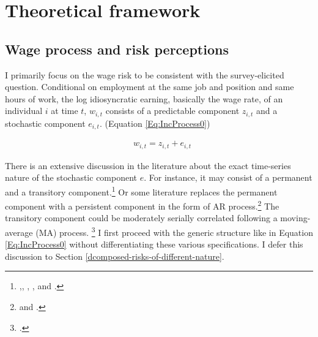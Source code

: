 
    \hypertarget{theoretical-framework}{%
\section{Theoretical framework}\label{theoretical-framework}}

\hypertarget{income-process-and-risk-perceptions}{%
\subsection{Wage process and risk
perceptions}\label{income-process-and-risk-perceptions}}

I primarily focus on the wage risk to be consistent with the survey-elicited question. Conditional on employment at the same job and position and same hours of work, the log idiosyncratic earning, basically the wage rate, of an individual \(i\) at time \(t\), $w_{i,t}$ consists of a predictable component $z_{i,t}$ and a stochastic component $e_{i,t}$. (Equation \ref{Eq:IncProcess0}) %


\begin{equation}
\begin{split}
\label{Eq:IncProcess0}
& w_{i,t} = z_{i,t}+ e_{i,t} 
\end{split}
\end{equation}

There is an extensive discussion in the literature about the exact time-series nature of the stochastic component $e$. For instance, it may consist of a permanent and a transitory component.\footnote{\cite{abowd1989covariance},\cite{gottschalk1994growth}, \cite{carroll1997nature}, \cite{blundell_consumption_2008}, and \cite{kaplan2010much}.} Or some literature replaces the permanent component with a persistent component in the form of AR process.\footnote{\cite{storesletten2004cyclical} and \cite{guvenen_empirical_2009}.} The transitory component could be moderately serially correlated following a moving-average (MA) process. \footnote{\cite{meghir2004income}.} I first proceed with the generic structure like in Equation \ref{Eq:IncProcess0} without differentiating these various specifications. I defer this discussion to Section \ref{dcomposed-risks-of-different-nature}. 


